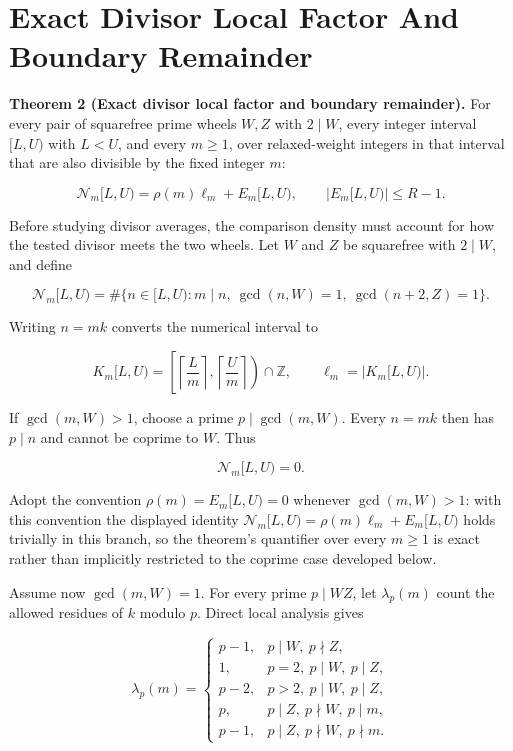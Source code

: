 \section{Exact Divisor Local Factor And Boundary Remainder}

\textbf{Theorem 2 (Exact divisor local factor and boundary remainder).}
For every pair of squarefree prime wheels $W,Z$ with $2\mid W$, every integer
interval $[L,U)$ with $L\lt U$, and every $m\ge1$, over relaxed-weight
integers in that interval that are also divisible by the fixed integer $m$:

\begin{equation*}
\mathcal N_m[L,U)=\rho(m)\ell_m+E_m[L,U),
\qquad
|E_m[L,U)|\le R-1.
\end{equation*}

Before studying divisor averages, the comparison density must account for how
the tested divisor meets the two wheels. Let $W$ and $Z$ be squarefree with
$2\mid W$, and define

\begin{equation*}
\mathcal N_m[L,U)
=
\#\{n\in[L,U):m\mid n,\ \gcd(n,W)=1,\ \gcd(n+2,Z)=1\}.
\end{equation*}

Writing $n=mk$ converts the numerical interval to

\begin{equation*}
K_m[L,U)
=
\left[
\left\lceil\frac Lm\right\rceil,
\left\lceil\frac Um\right\rceil
\right)\cap\mathbb Z,
\qquad
\ell_m=|K_m[L,U)|.
\end{equation*}

If $\gcd(m,W)>1$, choose a prime $p\mid\gcd(m,W)$. Every $n=mk$ then has
$p\mid n$ and cannot be coprime to $W$. Thus

\begin{equation*}
\mathcal N_m[L,U)=0.
\end{equation*}

Adopt the convention $\rho(m)=E_m[L,U)=0$ whenever $\gcd(m,W)>1$: with this
convention the displayed identity
$\mathcal N_m[L,U)=\rho(m)\ell_m+E_m[L,U)$ holds trivially in this branch,
so the theorem's quantifier over every $m\ge1$ is exact rather than
implicitly restricted to the coprime case developed below.

Assume now $\gcd(m,W)=1$. For every prime $p\mid WZ$, let
$\lambda_p(m)$ count the allowed residues of $k$ modulo $p$. Direct local
analysis gives

\begin{equation*}
\lambda_p(m)=
\begin{cases}
p-1,&p\mid W,\ p\nmid Z,\\
1,&p=2,\ p\mid W,\ p\mid Z,\\
p-2,&p>2,\ p\mid W,\ p\mid Z,\\
p,&p\mid Z,\ p\nmid W,\ p\mid m,\\
p-1,&p\mid Z,\ p\nmid W,\ p\nmid m.
\end{cases}
\end{equation*}

